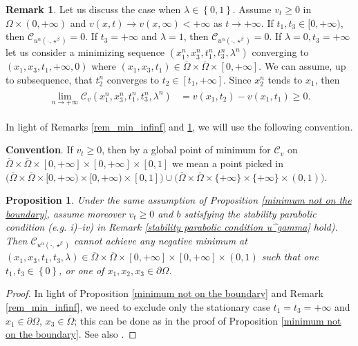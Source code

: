 \documentclass[11pt, reqno]{amsart}
\newtheorem{proposition}[lemma]{Proposition}
\theoremstyle{definition}
\newtheorem{remark}[lemma]{Remark}
\numberwithin{equation}{section}
\newcommand{\Omegabar}{\overline{\Omega}}
\begin{document}
\begin{remark}\label{remark lamba[0,1]}
Let us discuss the case when $\lambda\in\left\{0,1\right\}$. 
Assume $v_t\geq 0$ in $\Omega \times (0,+\infty)$ and $v(x,t)\to v(x,\infty)<+\infty$ as $t\to+\infty$. If $t_1,t_3\in [0,+\infty)$, then $\mathcal{C}_{u^\alpha(\cdot, \star^{\beta})}= 0$. 
If $t_3=+\infty$ and $\lambda=1$, then $\mathcal{C}_{u^\alpha(\cdot, \star^{\beta})}= 0$. 
If $\lambda = 0,t_3=+\infty$ let us consider a minimizing sequence $(x_1^n,x_3^n,t_1^n,t_3^n,\lambda^n)$ converging to $(x_1,x_3,t_1,+\infty,0)$ where $(x_1,x_3,t_1)\in\Omegabar\times \Omegabar\times [0,+\infty]$. 
We can assume, up to subsequence, that $t_2^n$ converges to $t_2\in[t_1,+\infty]$. Since $x_2^n$ tends to $x_1$, then 
\begin{align*}\begin{split}
			\lim_{n\to +\infty}\mathcal{C}_v(x_1^n,x_3^n,t_1^n,t_3^n,\lambda^n)&=v(x_1,t_2)-v(x_1,t_1)\geq 0.
	\end{split}
\end{align*}
\end{remark}
In light of Remarks \ref{rem_min_infinf} and \ref{remark lamba[0,1]}, we will use the following convention.

\smallskip

\textbf{Convention}. 
If $v_t\geq 0$, then by a global point of minimum for $\mathcal{C}_v$ on $\Omegabar\times \Omegabar\times [0,+\infty]\times [0,+\infty]\times [0,1]$ we mean a point picked in $\big(\Omegabar\times \Omegabar\times [0,+\infty)\times [0,+\infty) \times [0,1] \big) \cup \big(\Omegabar\times \Omegabar\times \{+\infty\}\times \{+\infty\}\times (0,1) \big)$. 
\begin{proposition}\label{minimum not on the boundary infinity}
	Under the same assumption of Proposition \ref{minimum not on the boundary}, assume moreover $v_t\geq 0$ and $b$ satisfying the stability parabolic condition (e.g. \textit{i})--\textit{iv}) in Remark \ref{stability parabolic condition u^gamma} hold). 
	Then $\mathcal{C}_{u^\alpha(\cdot, \star^{\beta})}$ cannot achieve any negative minimum at $(x_1,x_3,t_1,t_3,\lambda)\in \Omegabar \times \Omegabar \times [0,+\infty]\times [0,+\infty]\times (0,1) $ such that one $t_1,t_3\in \left\{0\right\}$, or one of $x_1,x_2,x_3\in \partial \Omega$. 
\end{proposition}
\begin{proof}
	In light of Proposition \ref{minimum not on the boundary} and Remark \ref{rem_min_infinf}, we need to exclude only the stationary case $t_1=t_3=+\infty$ and $x_1\in\partial \Omega$, $x_3\in \Omegabar$; this can be done as in the proof of Proposition \ref{minimum not on the boundary}. See also \cite{BuSq19,kennington}.
\end{proof}
\end{document}
